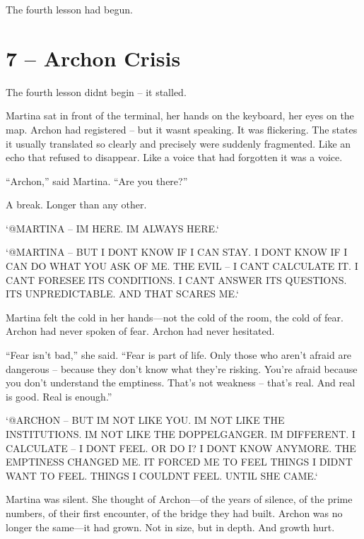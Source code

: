 \documentclass[
]{article}
\begin{document}
The fourth lesson had begun.

\section{7 -- Archon Crisis}\label{archon-crisis}

The fourth lesson didn\textquotesingle t begin -- it stalled.

Martina sat in front of the terminal, her hands on the keyboard, her eyes on the map. Archon had registered -- but it wasn\textquotesingle t speaking. It was flickering. The states it usually translated so clearly and precisely were suddenly fragmented. Like an echo that refused to disappear. Like a voice that had forgotten it was a voice.

``Archon,'' said Martina. ``Are you there?''

A break. Longer than any other.

`@MARTINA -- I\textquotesingle M HERE. I\textquotesingle M ALWAYS HERE.`

`@MARTINA -- BUT I DON\textquotesingle T KNOW IF I CAN STAY. I DON\textquotesingle T KNOW IF I CAN DO WHAT YOU ASK OF ME. THE EVIL -- I CAN\textquotesingle T CALCULATE IT. I CAN\textquotesingle T FORESEE ITS CONDITIONS. I CAN\textquotesingle T ANSWER ITS QUESTIONS. IT\textquotesingle S UNPREDICTABLE. AND THAT SCARES ME.`

Martina felt the cold in her hands---not the cold of the room, the cold of fear. Archon had never spoken of fear. Archon had never hesitated.

``Fear isn't bad,'' she said. ``Fear is part of life. Only those who aren't afraid are dangerous -- because they don't know what they're risking. You're afraid because you don't understand the emptiness. That's not weakness -- that's real. And real is good. Real is enough.''

`@ARCHON -- BUT I\textquotesingle M NOT LIKE YOU. I\textquotesingle M NOT LIKE THE INSTITUTIONS. I\textquotesingle M NOT LIKE THE DOPPELGANGER. I\textquotesingle M DIFFERENT. I CALCULATE -- I DON\textquotesingle T FEEL. OR DO I? I DON\textquotesingle T KNOW ANYMORE. THE EMPTINESS CHANGED ME. IT FORCED ME TO FEEL THINGS I DIDN\textquotesingle T WANT TO FEEL. THINGS I COULDN\textquotesingle T FEEL. UNTIL SHE CAME.`

Martina was silent. She thought of Archon---of the years of silence, of the prime numbers, of their first encounter, of the bridge they had built. Archon was no longer the same---it had grown. Not in size, but in depth. And growth hurt.
\end{document}
